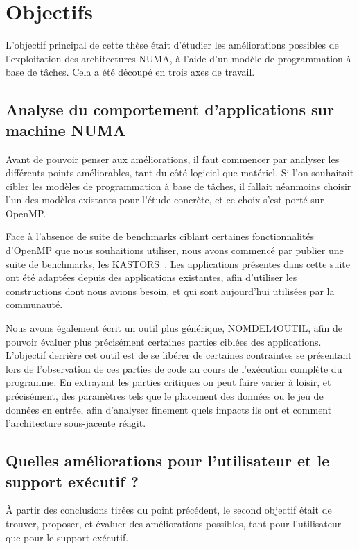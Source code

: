 \section{Objectifs}\label{sec:intro:objectives}

L'objectif principal de cette thèse était d'étudier les améliorations possibles de l'exploitation des architectures NUMA, à l'aide d'un modèle de programmation à base de tâches.
Cela a été découpé en trois axes de travail.


\subsection*{Analyse du comportement d'applications sur machine NUMA}

Avant de pouvoir penser aux améliorations, il faut commencer par analyser les différents points améliorables, tant du côté logiciel que matériel.
Si l'on souhaitait cibler les modèles de programmation à base de tâches, il fallait néanmoins choisir l'un des modèles existants pour l'étude concrète, et ce choix s'est porté sur OpenMP.

Face à l'absence de suite de benchmarks ciblant certaines fonctionnalités d'OpenMP que nous souhaitions utiliser, nous avons commencé par publier une suite de benchmarks, les KASTORS~\cite{Virouleau2014}.
Les applications présentes dans cette suite ont été adaptées depuis des applications existantes, afin d'utiliser les constructions dont nous avions besoin, et qui sont aujourd'hui utilisées par la communauté.

Nous avons également écrit un outil plus générique, NOMDEL4OUTIL, afin de pouvoir évaluer plus précisément certaines parties ciblées des applications.
L'objectif derrière cet outil est de se libérer de certaines contraintes se présentant lors de l'observation de ces parties de code au cours de l'exécution complète du programme.
En extrayant les parties critiques on peut faire varier à loisir, et précisément, des paramètres tels que le placement des données ou le jeu de données en entrée, afin d'analyser finement quels impacts ils ont et comment l'architecture sous-jacente réagit.


\subsection*{Quelles améliorations pour l'utilisateur et le support exécutif ?}

À partir des conclusions tirées du point précédent, le second objectif était de trouver, proposer, et évaluer des améliorations possibles, tant pour l'utilisateur que pour le support exécutif.

